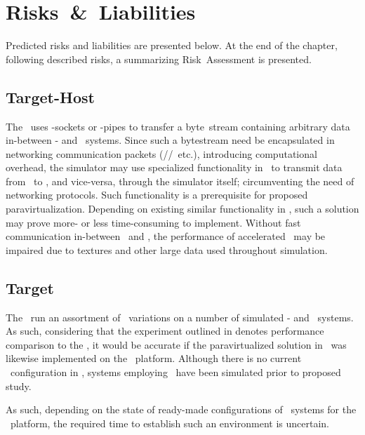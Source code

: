 
\chapter{Risks~\&~Liabilities}
\label{cha:risksandliabilities}
Predicted risks and liabilities are presented below.
At the end of the chapter, following described risks, a summarizing Risk~Assessment is presented.

\section{Target-Host~\termrw}
\label{sec:risksandliabilities_targethostrw}
The \termrefsolu\ uses \termunix -sockets or \termwinthirtytwo -pipes to transfer a byte~stream containing arbitrary data in-between  \termtarget - and \termhost\ systems.
Since such a bytestream need be encapsulated in networking communication packets (\termtcp /\termip /\termmac\ etc.), introducing computational overhead, the simulator may use specialized functionality in \termqemu\ to transmit data from \termtarget\ to \termhost , and vice-versa, through the simulator itself; circumventing the need of networking protocols.
Such functionality is a prerequisite for proposed paravirtualization.
Depending on existing similar functionality in \termsimics , such a solution may prove more- or less time-consuming to implement.
Without fast communication in-between \termhost\ and \termtarget , the performance of accelerated \termopengles\ may be impaired due to textures and other large data used throughout simulation.

\section{Target~\termos }
\label{sec:risksandliabilities_targetos}
The \termrefsolu\ run an assortment of \termandroid\ variations on a number of simulated \termarm - and \termxeightysix\ systems.
As such, considering that the experiment outlined in  denotes performance comparison to the \termrefsolu , it would be accurate if the paravirtualized solution in \termsimics\ was likewise implemented on the \termandroid\ platform.
Although there is no current \termandroid\ configuration in \termsimics , systems employing \termandroid\ have been simulated prior to proposed study.

As such, depending on the state of ready-made configurations of \termandroid\ systems for the \termsimics\ platform, the required time to establish such an environment is uncertain.

